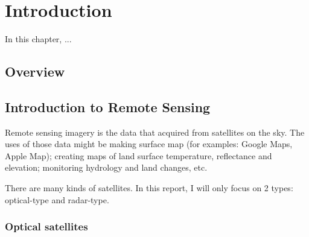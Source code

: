 \chapter{Introduction}
\label{chap-1-intro}
\begin{ChapAbstract}
In this chapter, ...
\end{ChapAbstract}


\section{Overview} %

\section{Introduction to Remote Sensing} %

Remote sensing imagery is the data that acquired from satellites on the sky. The uses of those data might be making surface map (for examples: Google Maps, Apple Map); creating maps of land surface temperature, reflectance and elevation; monitoring hydrology and land changes, etc. 


There are many kinds of satellites. In this report, I will only focus on 2 types: optical-type and radar-type.

\subsection{Optical satellites}

